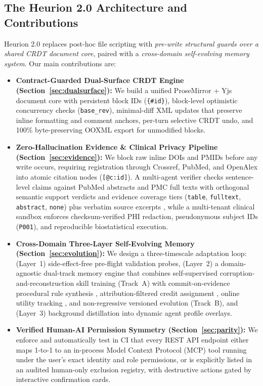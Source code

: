 \documentclass[11pt,a4paper]{article}
\begin{document}
\subsection{The Heurion 2.0 Architecture and Contributions}
Heurion 2.0 replaces post-hoc file scripting with \emph{pre-write structural guards over a shared CRDT document core}, paired with a \emph{cross-domain self-evolving memory system}. Our main contributions are:

\begin{itemize}[leftmargin=1.5em,itemsep=2pt]
  \item \textbf{Contract-Guarded Dual-Surface CRDT Engine (Section~\ref{sec:dualsurface}):} We build a unified ProseMirror + Yjs document core with persistent block IDs (\texttt{\{\#id\}}), block-level optimistic concurrency checks (\texttt{base\_rev}), minimal-diff XML updates that preserve inline formatting and comment anchors, per-turn selective CRDT undo, and 100\% byte-preserving OOXML export for unmodified blocks.
  \item \textbf{Zero-Hallucination Evidence \& Clinical Privacy Pipeline (Section~\ref{sec:evidence}):} We block raw inline DOIs and PMIDs before any write occurs, requiring registration through Crossref, PubMed, and OpenAlex into atomic citation nodes (\texttt{[@c:id]}). A multi-agent verifier checks sentence-level claims against PubMed abstracts and PMC full texts with orthogonal semantic support verdicts and evidence coverage tiers (\texttt{table}, \texttt{fulltext}, \texttt{abstract}, \texttt{none}) plus verbatim source excerpts \cite{safevantage2026}, while a multi-tenant clinical sandbox enforces checksum-verified PHI redaction, pseudonymous subject IDs (\texttt{P001}), and reproducible biostatistical execution.
  \item \textbf{Cross-Domain Three-Layer Self-Evolving Memory (Section~\ref{sec:evolution}):} We design a three-timescale adaptation loop: (Layer~1) side-effect-free pre-flight validation probes, (Layer~2) a domain-agnostic dual-track memory engine that combines self-supervised corruption-and-reconstruction skill training (Track~A) with commit-on-evidence procedural rule synthesis \cite{coem2026}, attribution-filtered credit assignment \cite{memskill2026}, online utility tracking \cite{msce2026}, and non-regressive versioned evolution \cite{skillv2026} (Track~B), and (Layer~3) background distillation into dynamic agent profile overlays.
  \item \textbf{Verified Human-AI Permission Symmetry (Section~\ref{sec:parity}):} We enforce and automatically test in CI that every REST API endpoint either maps 1-to-1 to an in-process Model Context Protocol (MCP) tool running under the user's exact identity and role permissions, or is explicitly listed in an audited human-only exclusion registry, with destructive actions gated by interactive confirmation cards.
\end{itemize}
\end{document}
